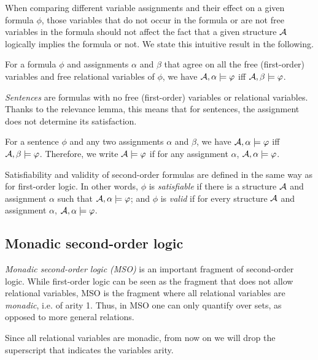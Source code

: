 \documentclass[11pt,twoside=off,numbers=noenddot]{scrbook}
\begin{document}
When comparing different variable assignments and their effect on a
given formula $\phi$, those variables that do not occur in the
formula or are not free variables in the formula should not affect
the fact that a given structure $\mathcal{A}$ logically implies the
formula or not. We state this intuitive result in the following.

\begin{lemma}
  For a formula $\phi$ and assignments $\alpha$ and $\beta$ that
  agree on all the free (first-order) variables and free relational
  variables of $\phi$, we have $\mathcal{A}, \alpha \models \varphi$ iff
  $\mathcal{A}, \beta \models \varphi$.
\end{lemma}

\emph{Sentences} are formulas with no free (first-order) variables or
relational variables. Thanks to the relevance lemma, this means that
for sentences, the assignment does not determine its satisfaction.

\begin{proposition}
  For a sentence $\phi$ and any two assignments $\alpha$ and $\beta$,
  we have $\mathcal{A}, \alpha \models \varphi$ iff $\mathcal{A}, \beta \models
  \varphi$. Therefore, we write $\mathcal{A} \models \varphi$ if for any
  assignment $\alpha$, $\mathcal{A}, \alpha \models \varphi$.
\end{proposition}

Satisfiability and validity of second-order formulas are defined in
the same way as for first-order logic. In other words, $\phi$ is
\emph{satisfiable} if there is a structure $\mathcal{A}$ and assignment
$\alpha$ such that $\mathcal{A}, \alpha \models \varphi$; and $\phi$ is
\emph{valid} if for every structure $\mathcal{A}$ and assignment
$\alpha$, $\mathcal{A}, \alpha \models \varphi$.

\subsection{Monadic second-order logic}
\emph{Monadic second-order logic (MSO)} is an important fragment of
second-order logic. While first-order logic can be seen as the
fragment that does not allow relational variables, MSO is the
fragment where all relational variables are \emph{monadic}, i.e. of
arity 1. Thus, in MSO one can only quantify over sets, as opposed to
more general relations.

\begin{abuse}
  Since all relational variables are monadic, from now on we will
  drop the superscript that indicates the variables arity.
\end{abuse}
\end{document}
